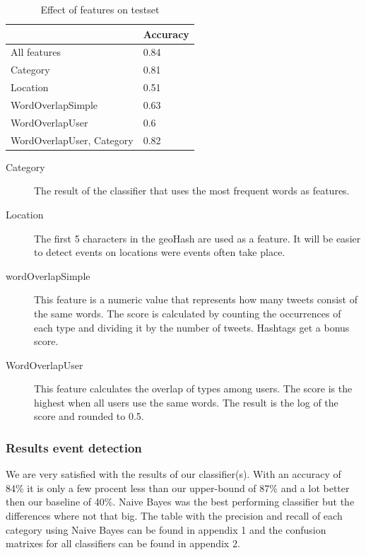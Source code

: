 \documentclass[
10pt, %
a4paper, %
oneside, %
headinclude,footinclude, %
BCOR5mm, %
]{scrartcl}
\begin{document}
\begin{table}[h]
 \centering
\caption[Effect of features]{Effect of features  on testset }
\begin{tabular}{|l|l|}
\hline
                          & Accuracy \\ \hline
All features              & 0.84     \\ \hline
Category                  & 0.81     \\ \hline
Location                  & 0.51     \\ \hline
WordOverlapSimple         & 0.63     \\ \hline
WordOverlapUser           & 0.6      \\ \hline
WordOverlapUser, Category & 0.82     \\ \hline
\end{tabular}

\end{table}

\begin{description}

\item[Category]
The result of the classifier that uses the most frequent words as features. 

\item[Location]
The first 5 characters in the geoHash are used as a feature. It will be easier to detect events on locations were events often take place.

\item[wordOverlapSimple]
This feature is a numeric value that represents how many tweets consist of the same words. The score is calculated by counting the occurrences of each type and dividing it by the number of tweets. Hashtags get a bonus score.

\item[WordOverlapUser]
This feature calculates the overlap of types among users. The score is the highest when all users use the same words. The result is the log of the score and rounded to 0.5.


\end{description}

\subsubsection{Results event detection}
We are very satisfied with the results of our classifier(s). With an accuracy of 84\% it is only a few procent less  than our upper-bound of 87\% and  a lot better then our baseline of 40\%. Naive Bayes was the best performing classifier but the differences where not that big. The table with the precision and recall of each category using Naive Bayes can be found in appendix 1 and the confusion matrixes for all classifiers can be found in appendix 2.
\end{document}
